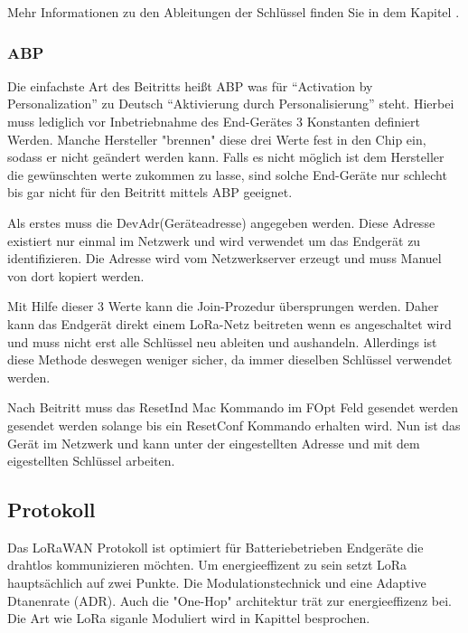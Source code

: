 \documentclass[a4paper,12pt]{article}
\begin{document}
                Mehr Informationen zu den Ableitungen der Schlüssel finden Sie in dem Kapitel .


            \subsubsection{ABP}
                Die einfachste Art des Beitritts heißt ABP was für ``Activation by Personalization'' zu Deutsch 
                ``Aktivierung durch Personalisierung'' steht. Hierbei muss lediglich vor Inbetriebnahme des 
                End-Gerätes 3 Konstanten definiert Werden. Manche Hersteller "brennen" diese drei Werte fest in den 
                Chip ein, sodass er nicht geändert werden kann. Falls es nicht möglich ist dem Hersteller die 
                gewünschten werte zukommen zu lasse, sind solche End-Geräte nur schlecht bis gar nicht für den Beitritt 
                mittels ABP geeignet.

                Als erstes muss die DevAdr(Geräteadresse) angegeben werden. Diese Adresse existiert nur einmal im 
                Netzwerk und wird verwendet um das Endgerät zu identifizieren. Die Adresse wird vom Netzwerkserver 
                erzeugt und muss Manuel von dort kopiert werden. 

                Mit Hilfe dieser 3 Werte kann die Join-Prozedur übersprungen werden. Daher kann 
                das Endgerät direkt einem LoRa-Netz beitreten wenn es angeschaltet wird und muss nicht erst alle 
                Schlüssel neu ableiten und aushandeln. Allerdings ist diese Methode deswegen weniger sicher, da immer 
                dieselben Schlüssel verwendet werden.

                Nach Beitritt muss das ResetInd Mac Kommando im FOpt Feld gesendet werden gesendet werden solange bis 
                ein ResetConf Kommando erhalten wird. Nun ist das Gerät im Netzwerk und kann unter der eingestellten 
                Adresse und mit dem eigestellten Schlüssel arbeiten.\cite[S. 64]{LoRaSpec}    
        \subsection{Protokoll} \label{sec:protokoll}
            Das LoRaWAN Protokoll ist optimiert für Batteriebetrieben Endgeräte die drahtlos kommunizieren möchten. 
            Um energieeffizent zu sein setzt LoRa hauptsächlich auf zwei Punkte. Die Modulationstechnick und eine 
            Adaptive Dtanenrate (ADR). Auch die 
            "One-Hop" architektur trät zur energieeffizenz bei. Die Art wie LoRa siganle Moduliert wird in Kapittel 
             besprochen. \cite[S,1 f]{LoraClasses}
\end{document}
